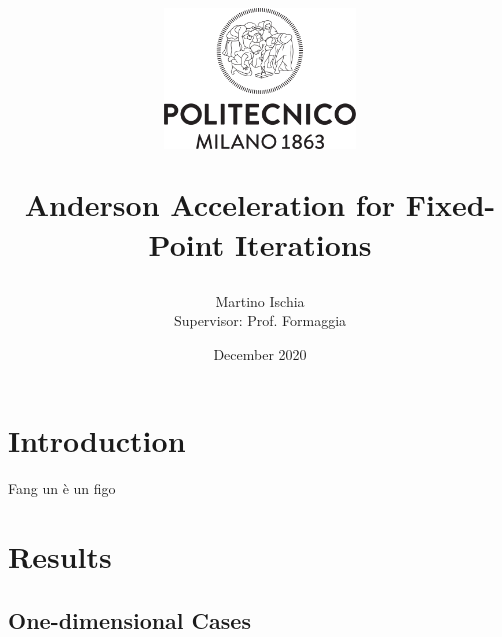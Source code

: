 \documentclass[12pt]{article}
\title{
\vspace{-30mm}\begin{figure}[h]
\centering
\includegraphics[width=2in]{logo_polimi.png}
\end{figure}Anderson Acceleration for Fixed-Point Iterations}
\author{Martino Ischia\\ \footnotesize{Supervisor: Prof. Formaggia}}
\date{December 2020}
\begin{document}
\maketitle

\tableofcontents

\section{Introduction}
	Fang un è un figo \cite{Fang}

\section{Results}
\subsection{One-dimensional Cases}

\printbibliography[heading=bibintoc,
title={Bibliography}]
\end{document}
